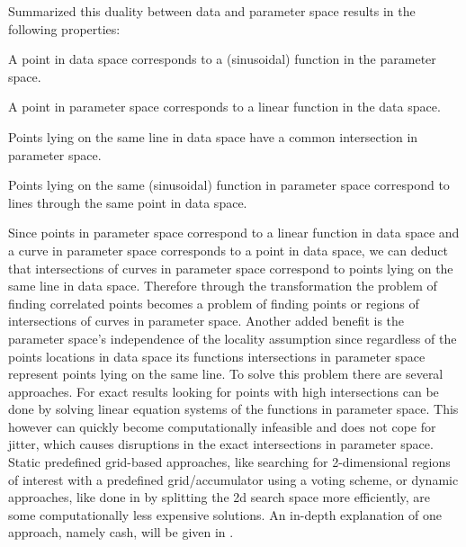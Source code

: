 Summarized this duality between data and parameter space results in the following properties:\label{ssec:properties}
\begin{property}\label{prop:hough1}
A point in data space corresponds to a (sinusoidal) function in the parameter space. 
\end{property}
\begin{property}\label{prop:hough2}
A point in parameter space corresponds to a linear function in the data space.
\end{property}
\begin{property}\label{prop:hough3}
Points lying on the same line in data space have a common intersection in parameter space.
\end{property}
\begin{property}\label{prop:hough4}
Points lying on the same (sinusoidal) function in parameter space correspond to lines through the same point in data space.
\end{property}

Since points in parameter space correspond to a linear function in data space and a curve in parameter space corresponds to a point in data space, we can deduct that intersections of curves in parameter space correspond to points lying on the same line in data space. Therefore through the transformation the problem of finding correlated points becomes a problem of finding points or regions of intersections of curves in parameter space. Another added benefit is the parameter space's independence of the locality assumption since regardless of the points locations in data space its functions intersections in parameter space represent points lying on the same line.  To solve this problem there are several approaches. For exact results looking for points with high intersections can be done by solving linear equation systems of the functions in parameter space. This however can quickly become computationally infeasible and does not cope for jitter, which causes disruptions in the exact intersections in parameter space. Static predefined grid-based approaches, like searching for 2-dimensional regions of interest with a predefined grid/accumulator using a voting scheme, or dynamic approaches, like done in \textcite{CASHachtert2008global} by splitting the 2d search space more efficiently, are some computationally less expensive solutions. An in-depth explanation of one approach, namely \acrfull{cash}, will be given in .

